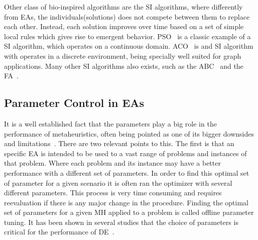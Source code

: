 Other class of bio-inspired algorithms are the \ac{SI} algorithms, where differently from
\ac{EA}s, the individuals(solutions) does not compete between them to replace each other.
Instead, each solution improves over time based on a set of simple local rules which
gives rise to emergent behavior. \ac{PSO}~\cite{eberhart1995new} is a classic
example of a \ac{SI} algorithm, which operates on a continuous domain.
\ac{ACO}~\cite{dorigo1997ant} is and SI algorithm with operates in a discrete environment, being specially
well suited for graph applications. Many other \ac{SI} algorithms also exists, such
as the \ac{ABC}~\cite{karaboga2007powerful} and the
\ac{FA}~\cite{yang2009firefly}.


\vspace{2mm}

% 
% 

\subsection{Parameter Control in EAs}

It is a well established fact that the parameters play a big role in the
performance of metaheuristics, often being pointed as one of its bigger
downsides and limitations~\cite{parpinelli18review}. There are two relevant points to this.
The first is that an specific \ac{EA} is intended to be used to a vast range of
problems and instances of that problem. Where each problem and its instance
may have a better performance with a different set of parameters. In order
to find this optimal set of parameter for a given scenario it is often
ran the optimizer with several different parameters. This process is
very time consuming and requires reevaluation if there is any major
change in the procedure. Finding the optimal set of parameters for a given
\ac{MH} applied to a problem is called offline parameter tuning.
It has been shown in several studies that the choice of parameters
is critical for the performance of \ac{DE}~\cite{karafotias2015parameter}.

